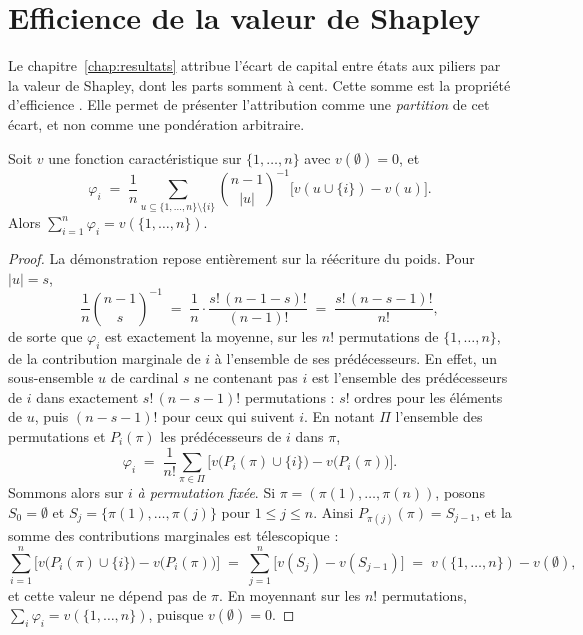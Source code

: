 \section*{Efficience de la valeur de Shapley}
\label{sec:ann-efficience-shapley}

Le chapitre~\ref{chap:resultats} attribue l'écart de capital entre états aux piliers par la valeur de
Shapley, dont les parts somment à cent. Cette somme est la propriété d'efficience
\citep{Shapley1953}. Elle permet de présenter l'attribution comme une \emph{partition} de cet écart,
et non comme une pondération arbitraire.

\begin{proposition}[Efficience]
\label{prop:efficience}
Soit $v$ une fonction caractéristique sur $\{1,\dots,n\}$ avec $v(\emptyset)=0$, et
\[
  \varphi_i \;=\; \frac1n \sum_{u \subseteq \{1,\dots,n\}\setminus\{i\}} \binom{n-1}{|u|}^{-1}
                  \bigl[v(u \cup \{i\}) - v(u)\bigr].
\]
Alors $\sum_{i=1}^{n} \varphi_i = v(\{1,\dots,n\})$.
\end{proposition}

\begin{proof}
La démonstration repose entièrement sur la réécriture du poids. Pour $|u|=s$,
\begin{equation}
  \frac1n \binom{n-1}{s}^{-1} \;=\; \frac1n \cdot \frac{s!\,(n-1-s)!}{(n-1)!}
  \;=\; \frac{s!\,(n-s-1)!}{n!},
  \label{eq:poids-shapley}
\end{equation}
de sorte que $\varphi_i$ est exactement la moyenne, sur les $n!$ permutations de
$\{1,\dots,n\}$, de la contribution marginale de $i$ à l'ensemble de ses prédécesseurs. En effet,
un sous-ensemble $u$ de cardinal $s$ ne contenant pas $i$ est l'ensemble des prédécesseurs de $i$
dans exactement $s!\,(n-s-1)!$ permutations : $s!$ ordres pour les éléments de $u$, puis
$(n-s-1)!$ pour ceux qui suivent $i$. En notant $\Pi$ l'ensemble des permutations et $P_i(\pi)$
les prédécesseurs de $i$ dans $\pi$,
\[
  \varphi_i \;=\; \frac{1}{n!} \sum_{\pi \in \Pi}
              \bigl[v\bigl(P_i(\pi) \cup \{i\}\bigr) - v\bigl(P_i(\pi)\bigr)\bigr].
\]
Sommons alors sur $i$ \emph{à permutation fixée}. Si $\pi = (\pi(1),\dots,\pi(n))$, posons $S_0=\emptyset$ et $S_j=\{\pi(1),\dots,\pi(j)\}$ pour $1\le j\le n$. Ainsi $P_{\pi(j)}(\pi)=S_{j-1}$, et la somme des contributions marginales est télescopique :
\[
  \sum_{i=1}^{n} \bigl[v\bigl(P_i(\pi)\cup\{i\}\bigr)-v\bigl(P_i(\pi)\bigr)\bigr]
  \;=\; \sum_{j=1}^{n} \bigl[v(S_j)-v(S_{j-1})\bigr]
  \;=\; v(\{1,\dots,n\}) - v(\emptyset),
\]
et cette valeur ne dépend pas de $\pi$. En moyennant sur les $n!$ permutations,
$\sum_i \varphi_i = v(\{1,\dots,n\})$, puisque $v(\emptyset)=0$.
\end{proof}

